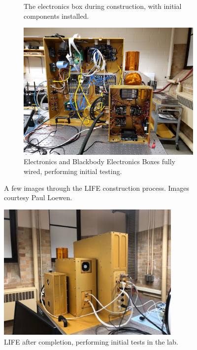 \begin{figure}
\begin{subfigure}[h]{0.4\textwidth}
        \caption{The electronics box during construction, with initial components installed.}
        \label{fig:Ebox_during_construction}
    \end{subfigure}
    \begin{subfigure}[h]{0.6\textwidth}
        \centering
        \includegraphics[width=\textwidth]{chap3_images/electronics_boxes_initial_boot.jpg}
        \caption{Electronics and Blackbody Electronics Boxes fully wired, performing initial testing.}
        \label{fig:Ebox_fully_wired}
    \end{subfigure}
    \caption{A few images through the LIFE construction process. Images courtesy Paul Loewen.}
    \label{LIFE_construction}
\end{figure}

\begin{figure}
    \centering
    \includegraphics[width=0.8\textwidth]{chap3_images/LIFE_in_lab.jpg}
    \caption{LIFE after completion, performing initial tests in the lab.}
    \label{fig:LIFE_after_build}
\end{figure}

